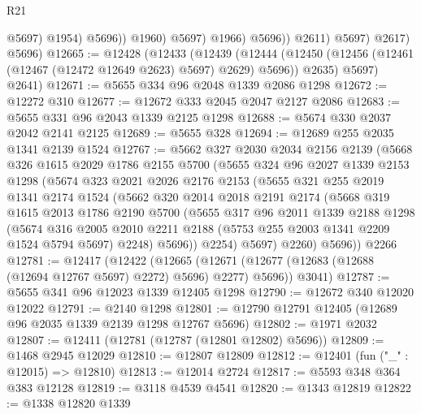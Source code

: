 \begin{lexlean}{R21}
\begin{coremodule}
                              @5697)
                            @1954)
                          @5696))
                      @1960)
                    @5697)
                  @1966)
                @5696))
            @2611)
          @5697)
        @2617)
      @5696)
@12665 := @12428
    (@12433
      (@12439
        (@12444 (@12450 (@12456 (@12461 (@12467 (@12472 @12649 @2623) @5697) @2629) @5696)) @2635)
        @5697)
      @2641)
@12671 := @5655 @334 @96 @2048 @1339 @2086 @1298
@12672 := @12272 @310
@12677 := @12672 @333 @2045 @2047 @2127 @2086
@12683 := @5655 @331 @96 @2043 @1339 @2125 @1298
@12688 := @5674 @330 @2037 @2042 @2141 @2125
@12689 := @5655 @328
@12694 := @12689 @255 @2035 @1341 @2139 @1524
@12767 := @5662
    @327
    @2030
    @2034
    @2156
    @2139
    (@5668
      @326
      @1615
      @2029
      @1786
      @2155
      @5700
      (@5655
        @324
        @96
        @2027
        @1339
        @2153
        @1298
        (@5674
          @323
          @2021
          @2026
          @2176
          @2153
          (@5655
            @321
            @255
            @2019
            @1341
            @2174
            @1524
            (@5662
              @320
              @2014
              @2018
              @2191
              @2174
              (@5668
                @319
                @1615
                @2013
                @1786
                @2190
                @5700
                (@5655
                  @317
                  @96
                  @2011
                  @1339
                  @2188
                  @1298
                  (@5674
                    @316
                    @2005
                    @2010
                    @2211
                    @2188
                    (@5753 @255 @2003 @1341 @2209 @1524 @5794 @5697)
                    @2248)
                  @5696))
              @2254)
            @5697)
          @2260)
        @5696))
    @2266
@12781 := @12417
    (@12422
      (@12665 (@12671 (@12677 (@12683 (@12688 (@12694 @12767 @5697) @2272) @5696) @2277) @5696))
      @3041)
@12787 := @5655 @341 @96 @12023 @1339 @12405 @1298
@12790 := @12672 @340 @12020 @12022
@12791 := @2140 @1298
@12801 := @12790 @12791 @12405 (@12689 @96 @2035 @1339 @2139 @1298 @12767 @5696)
@12802 := @1971 @2032
@12807 := @12411 (@12781 (@12787 (@12801 @12802) @5696))
@12809 := @1468 @2945 @12029
@12810 := @12807 @12809
@12812 := @12401 (fun ("_" : @12015) => @12810)
@12813 := @12014 @2724
@12817 := @5593 @348 @364 @383 @12128
@12819 := @3118 @4539 @4541
@12820 := @1343 @12819
@12822 := @1338 @12820 @1339

\end{coremodule}
\end{lexlean}
